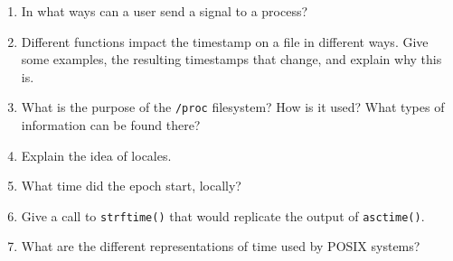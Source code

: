 \documentclass[letterpaper,10pt,onecolumn,titlepage]{article}
\begin{document}
\begin{enumerate}
\begin{quote}

\end{quote}

\item In what ways can a user send a signal to a process?

\begin{quote}

\end{quote}

\item Different functions impact the timestamp on a file in different ways. Give some
  examples, the resulting timestamps that change, and explain why this is.

\begin{quote}

\end{quote}

\item What is the purpose of the \texttt{/proc} filesystem? How is it used? What types of
  information can be found there?

\begin{quote}

\end{quote}

\item Explain the idea of locales.

\begin{quote}

\end{quote}

\item What time did the epoch start, locally?

\begin{quote}

\end{quote}

\item Give a call to \texttt{strftime()} that would replicate the output of
  \texttt{asctime()}.

\begin{quote}

\end{quote}

\item What are the different representations of time used by POSIX systems?

\begin{quote}

\end{quote}


\end{enumerate}
\end{document}
